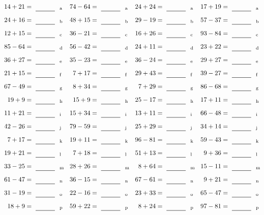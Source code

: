 \documentclass
[
  draft    = true,
  fontsize = 11pt,
  parskip  = half-
]
{scrartcl}
\begin{document}
\clearpage
\begin{align*}
    \pline{14+21}&=\rline{a}
  & \pline{74-64}&=\rline{a}
  & \pline{24+24}&=\rline{a}
  & \pline{17+19}&=\rline{a} \\[1ex]
    \pline{24+16}&=\rline{b}
  & \pline{48+15}&=\rline{b}
  & \pline{29-19}&=\rline{b}
  & \pline{57-37}&=\rline{b} \\[1ex]
    \pline{12+15}&=\rline{c}
  & \pline{36-21}&=\rline{c}
  & \pline{16+26}&=\rline{c}
  & \pline{93-84}&=\rline{c} \\[1ex]
    \pline{85-64}&=\rline{d}
  & \pline{56-42}&=\rline{d}
  & \pline{24+11}&=\rline{d}
  & \pline{23+22}&=\rline{d} \\[1ex]
    \pline{36+27}&=\rline{e}
  & \pline{35-23}&=\rline{e}
  & \pline{36-24}&=\rline{e}
  & \pline{29+27}&=\rline{e} \\[1ex]
    \pline{21+15}&=\rline{f}
  & \pline{7+17}&=\rline{f}
  & \pline{29+43}&=\rline{f}
  & \pline{39-27}&=\rline{f} \\[1ex]
    \pline{67-49}&=\rline{g}
  & \pline{8+34}&=\rline{g}
  & \pline{7+29}&=\rline{g}
  & \pline{86-68}&=\rline{g} \\[1ex]
    \pline{19+9}&=\rline{h}
  & \pline{15+9}&=\rline{h}
  & \pline{25-17}&=\rline{h}
  & \pline{17+11}&=\rline{h} \\[1ex]
    \pline{11+21}&=\rline{i}
  & \pline{15+34}&=\rline{i}
  & \pline{13+11}&=\rline{i}
  & \pline{66-48}&=\rline{i} \\[1ex]
    \pline{42-26}&=\rline{j}
  & \pline{79-59}&=\rline{j}
  & \pline{25+29}&=\rline{j}
  & \pline{34+14}&=\rline{j} \\[1ex]
    \pline{7+17}&=\rline{k}
  & \pline{19+11}&=\rline{k}
  & \pline{96-81}&=\rline{k}
  & \pline{59-43}&=\rline{k} \\[1ex]
    \pline{19+21}&=\rline{l}
  & \pline{7+18}&=\rline{l}
  & \pline{51+13}&=\rline{l}
  & \pline{9+36}&=\rline{l} \\[1ex]
    \pline{33-25}&=\rline{m}
  & \pline{28+26}&=\rline{m}
  & \pline{8+64}&=\rline{m}
  & \pline{15-11}&=\rline{m} \\[1ex]
    \pline{61-47}&=\rline{n}
  & \pline{36-15}&=\rline{n}
  & \pline{67-61}&=\rline{n}
  & \pline{9+21}&=\rline{n} \\[1ex]
    \pline{31-19}&=\rline{o}
  & \pline{22-16}&=\rline{o}
  & \pline{23+33}&=\rline{o}
  & \pline{65-47}&=\rline{o} \\[1ex]
    \pline{18+9}&=\rline{p}
  & \pline{59+22}&=\rline{p}
  & \pline{8+24}&=\rline{p}
  & \pline{97-81}&=\rline{p}
\end{align*}
\end{document}
